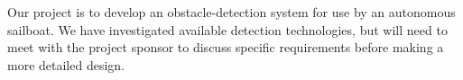 Our project is to develop an obstacle-detection system for use by an autonomous sailboat.  We have investigated available detection technologies, but will need to meet with the project sponsor to discuss specific requirements before making a more detailed design.